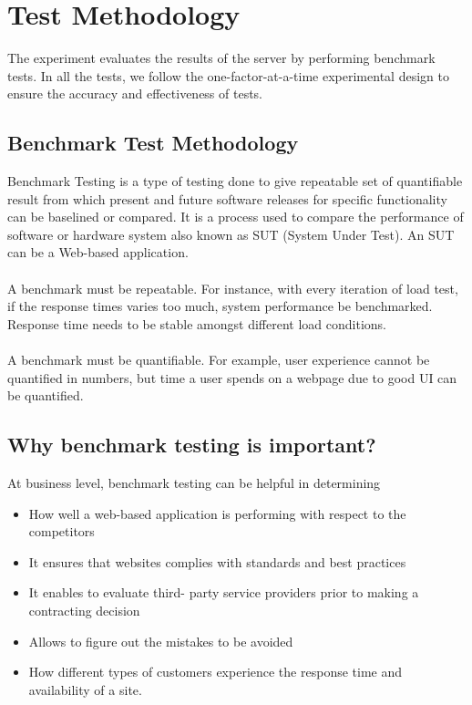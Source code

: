 \documentclass[../thesis.tex]{subfiles}
\begin{document}
\section{Test Methodology}
	The experiment evaluates the results of the server by performing benchmark tests. In all the tests, we follow the one-factor-at-a-time experimental design \cite{oaat} to ensure the accuracy and effectiveness of tests.

\subsection{Benchmark Test Methodology}
Benchmark Testing is a type of testing done to give repeatable set of quantifiable result from which present and future software releases for specific functionality can be baselined or compared. It is a process used to compare the performance of software or hardware system also known as SUT (System Under Test). An SUT can be a Web-based application.
\paragraph{}
A benchmark must be repeatable. For instance, with every iteration of load test, if the response times varies too much, system performance be benchmarked. Response time needs to be stable amongst different load conditions.
\paragraph{}
A benchmark must be quantifiable. For example, user experience cannot be quantified in numbers, but time a user spends on a webpage due to good UI can be quantified.

\subsection*{Why benchmark testing is important?}
At business level, benchmark testing can be helpful in determining
\vspace{5mm}
\begin{itemize}
	\item How well a web-based application is performing with respect to the competitors
	\item It ensures that websites complies with standards and best practices
	\item It enables to evaluate third- party service providers prior to making a contracting decision
	\item Allows to figure out the mistakes to be avoided
	\item How different types of customers experience the response time and availability of a site.
\end{itemize}
\end{document}
